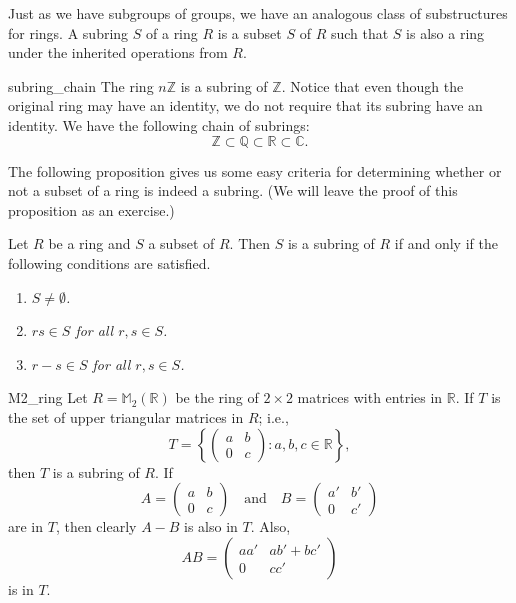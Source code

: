  
\medskip
 
 
Just as we have subgroups of groups, we have an analogous class of 
\mbox{substructures} for rings. A {\bfi subring} $S$ 
of a ring
$R$ is a subset $S$ of $R$ such that $S$ is also a ring under the
inherited operations from $R$.
 
 
\begin{example}{subring_chain}
The ring $n {\mathbb Z}$ is a subring of ${\mathbb Z}$.  Notice that even
though the original ring may have an identity, we do not require
that its subring have an identity. We have the following chain of
subrings: 
\[
{\mathbb Z} \subset {\mathbb Q} \subset {\mathbb R} \subset {\mathbb C}.
\]
\end{example}
 
 

 
 
The following proposition gives us some easy criteria for determining
whether or not a  subset of a ring is indeed a subring. (We will leave
the proof of this proposition as an exercise.)
 
 
\begin{proposition}\label{rings:prop2}
Let $R$ be a ring and $S$ a subset of $R$.  Then $S$ is a subring of
$R$ if and only if the following conditions are satisfied. 
\begin{enumerate}
 
\rm \item \it
$S \neq \emptyset$.
 
\rm \item \it
$rs \in S$ for all $r, s \in S$.
 
\rm \item \it
$r-s \in S$ for all $r, s \in S$.
 
\end{enumerate}
\end{proposition}
 
 
\begin{example}{M2_ring}
Let  $R ={\mathbb M}_2( {\mathbb R} )$ be the ring of $2 \times 2$ matrices
with entries in ${\mathbb R}$. If $T$ is the set of upper triangular
matrices in $R$; i.e.,
\[
T =
\left\{
\begin{pmatrix}
a & b \\
0 & c
\end{pmatrix}
: a, b, c \in {\mathbb R}
\right\},
\]
then $T$ is a subring of $R$. If
\[
A=
\begin{pmatrix}
a & b \\
0 & c
\end{pmatrix}
\quad \text{and} \quad
B =
\begin{pmatrix}
a' & b' \\
0 & c'
\end{pmatrix}
\]
are in $T$, then clearly $A-B$ is also in $T$. Also,
\[
AB =
\begin{pmatrix}
a a' & ab' + bc' \\
0 & cc'
\end{pmatrix}
\]
is in $T$.
\end{example}
 
